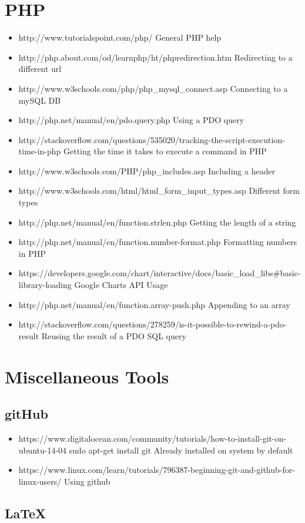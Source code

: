 \documentclass[12pt]{article}
\begin{document}
\section{PHP}
	\begin{itemize}
		\item http://www.tutorialspoint.com/php/
		\subitem General PHP help
		\item http://php.about.com/od/learnphp/ht/phpredirection.htm
		\subitem Redirecting to a different url
		\item http://www.w3schools.com/php/php\_mysql\_connect.asp
		\subitem Connecting to a mySQL DB
		\item http://php.net/manual/en/pdo.query.php
		\subitem Using a PDO query
		\item http://stackoverflow.com/questions/535020/tracking-the-script-execution-time-in-php
		\subitem Getting the time it takes to execute a command in PHP
		\item http://www.w3schools.com/PHP/php\_includes.asp
		\subitem Including a header
		\item http://www.w3schools.com/html/html\_form\_input\_types.asp
		\subitem Different form types
		\item http://php.net/manual/en/function.strlen.php
		\subitem Getting the length of a string
		\item http://php.net/manual/en/function.number-format.php
		\subitem Formatting numbers in PHP
		\item https://developers.google.com/chart/interactive/docs/basic_load_libs#basic-library-loading
		\subitem Google Charts API Usage
		\item http://php.net/manual/en/function.array-push.php
		\subitem Appending to an array
		\item http://stackoverflow.com/questions/278259/is-it-possible-to-rewind-a-pdo-result
		\subitem Reusing the result of a PDO SQL query
	\end{itemize}
\section{Miscellaneous Tools}
	\subsection{gitHub}
	\begin{itemize}
		\item https://www.digitalocean.com/community/tutorials/how-to-install-git-on-ubuntu-14-04
		\subitem sudo apt-get install git
		\subitem Already installed on system by default
		\item https://www.linux.com/learn/tutorials/796387-beginning-git-and-github-for-linux-users/
			\subitem Using github
	\end{itemize}
	\subsection{LaTeX}
\end{document}
